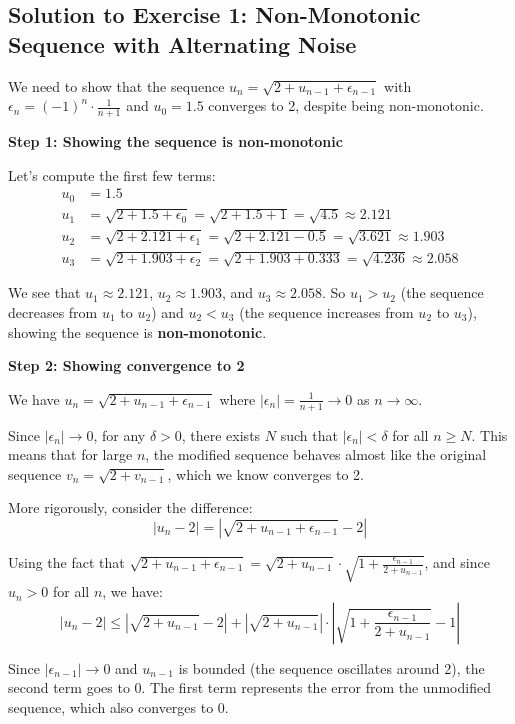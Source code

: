 \documentclass[12pt,a4paper]{article}
\theoremstyle{definition}
\begin{document}
\subsection{Solution to Exercise 1: Non-Monotonic Sequence with Alternating Noise}

We need to show that the sequence $u_n = \sqrt{2 + u_{n-1} + \epsilon_{n-1}}$ with $\epsilon_n = (-1)^n \cdot \frac{1}{n+1}$ and $u_0 = 1.5$ converges to 2, despite being non-monotonic.

\textbf{Step 1: Showing the sequence is non-monotonic}

Let's compute the first few terms:
\begin{align*}
u_0 &= 1.5\\
u_1 &= \sqrt{2 + 1.5 + \epsilon_0} = \sqrt{2 + 1.5 + 1} = \sqrt{4.5} \approx 2.121\\
u_2 &= \sqrt{2 + 2.121 + \epsilon_1} = \sqrt{2 + 2.121 - 0.5} = \sqrt{3.621} \approx 1.903\\
u_3 &= \sqrt{2 + 1.903 + \epsilon_2} = \sqrt{2 + 1.903 + 0.333} = \sqrt{4.236} \approx 2.058
\end{align*}

We see that $u_1 \approx 2.121$, $u_2 \approx 1.903$, and $u_3 \approx 2.058$. So $u_1 > u_2$ (the sequence decreases from $u_1$ to $u_2$) and $u_2 < u_3$ (the sequence increases from $u_2$ to $u_3$), showing the sequence is \textbf{non-monotonic}.

\textbf{Step 2: Showing convergence to 2}

We have $u_n = \sqrt{2 + u_{n-1} + \epsilon_{n-1}}$ where $|\epsilon_n| = \frac{1}{n+1} \to 0$ as $n \to \infty$.

Since $|\epsilon_n| \to 0$, for any $\delta > 0$, there exists $N$ such that $|\epsilon_n| < \delta$ for all $n \geq N$. This means that for large $n$, the modified sequence behaves almost like the original sequence $v_n = \sqrt{2 + v_{n-1}}$, which we know converges to 2.

More rigorously, consider the difference:
\[
|u_n - 2| = \left|\sqrt{2 + u_{n-1} + \epsilon_{n-1}} - 2\right|
\]

Using the fact that $\sqrt{2 + u_{n-1} + \epsilon_{n-1}} = \sqrt{2 + u_{n-1}} \cdot \sqrt{1 + \frac{\epsilon_{n-1}}{2 + u_{n-1}}}$, and since $u_n > 0$ for all $n$, we have:
\[
|u_n - 2| \leq \left|\sqrt{2 + u_{n-1}} - 2\right| + \left|\sqrt{2 + u_{n-1}}\right| \cdot \left|\sqrt{1 + \frac{\epsilon_{n-1}}{2 + u_{n-1}}} - 1\right|
\]

Since $|\epsilon_{n-1}| \to 0$ and $u_{n-1}$ is bounded (the sequence oscillates around 2), the second term goes to 0. The first term represents the error from the unmodified sequence, which also converges to 0.
\end{document}

